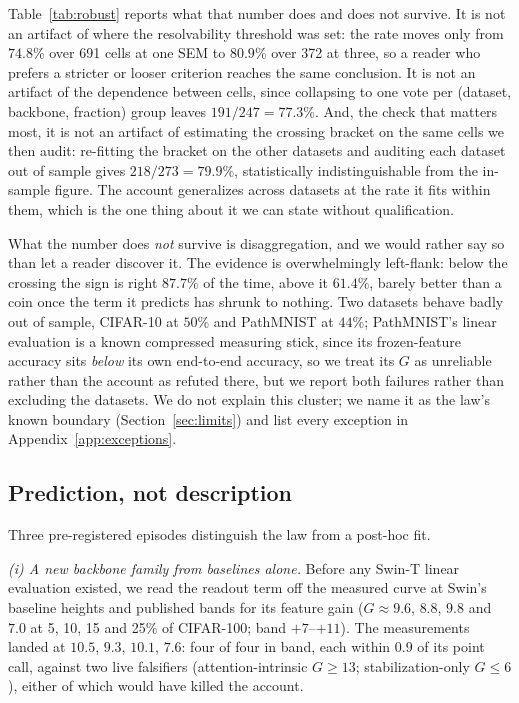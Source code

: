 Table~\ref{tab:robust} reports what that number does and does not survive.
It is not an artifact of where the resolvability threshold was set: the
rate moves only from $74.8\%$ over 691 cells at one SEM to $80.9\%$ over
372 at three, so a reader who prefers a stricter or looser criterion
reaches the same conclusion. It is not an artifact of the dependence
between cells, since collapsing to one vote per (dataset, backbone,
fraction) group leaves $191/247 = 77.3\%$. And, the check that matters
most, it is not an artifact of estimating the crossing bracket on the same
cells we then audit: re-fitting the bracket on the other datasets and
auditing each dataset out of sample gives $218/273 = 79.9\%$,
statistically indistinguishable from the in-sample figure. The account
generalizes across datasets at the rate it fits within them, which is the
one thing about it we can state without qualification.

What the number does \emph{not} survive is disaggregation, and we would
rather say so than let a reader discover it. The evidence is
overwhelmingly left-flank: below the crossing the sign is right $87.7\%$
of the time, above it $61.4\%$, barely better than a coin once the term it
predicts has shrunk to nothing. Two datasets behave badly out of sample,
CIFAR-10 at $50\%$ and PathMNIST at $44\%$; PathMNIST's linear evaluation
is a known compressed measuring stick, since its frozen-feature accuracy
sits \emph{below} its own end-to-end accuracy, so we treat its $G$ as
unreliable rather than the account as refuted there, but we report both
failures rather than excluding the datasets. We do not
explain this cluster; we name it as the law's known boundary
(Section~\ref{sec:limits}) and list every exception in
Appendix~\ref{app:exceptions}.

\subsection{Prediction, not description}\label{sec:lawpredict}
Three pre-registered episodes distinguish the law from a post-hoc fit.

\emph{(i) A new backbone family from baselines alone.} Before any Swin-T
linear evaluation existed, we read the readout term off the measured curve at Swin's
baseline heights and published bands for its feature gain
($G \approx 9.6$, $8.8$, $9.8$ and $7.0$ at 5, 10, 15 and 25\% of
CIFAR-100; band
$+7$--$+11$). The measurements landed at $10.5$, $9.3$, $10.1$, $7.6$: four of
four in band, each within $0.9$ of its point call, against two live
falsifiers (attention-intrinsic $G{\geq}13$; stabilization-only
$G{\leq}6$), either of which would have killed the account.

